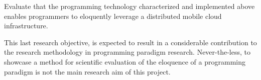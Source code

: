\begin{research-objective}[Repeated] \label{objective:evaluate}

Evaluate that the programming technology characterized and implemented
above enables programmers to eloquently leverage a distributed mobile
cloud infrastructure.

\end{research-objective}

This last research objective, is expected to result in a considerable
contribution to the research methodology in programming paradigm
research. Never-the-less, to showcase a method for scientific
evaluation of the eloquence of a programming paradigm is not the main
research aim of this project.
